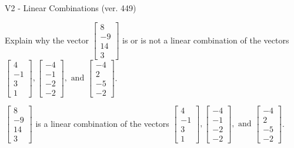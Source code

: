 \begin{exercise}
  \begin{exerciseTitle}V2 - Linear Combinations (ver. 449)\end{exerciseTitle}
  \begin{exerciseStatement}
    Explain why the vector \(\left[\begin{array}{c}
8 \\
-9 \\
14 \\
3
\end{array}\right]\)  is or is not a linear 
	combination of the vectors \(\left[\begin{array}{c}
4 \\
-1 \\
3 \\
1
\end{array}\right] , \left[\begin{array}{c}
-4 \\
-1 \\
-2 \\
-2
\end{array}\right] , \text{ and } \left[\begin{array}{c}
-4 \\
2 \\
-5 \\
-2
\end{array}\right]\).
	


  \end{exerciseStatement}
  \begin{exerciseAnswer}
   \(\left[\begin{array}{c}
8 \\
-9 \\
14 \\
3
\end{array}\right]\) 
  	 is  
	a linear combination of the vectors \(\left[\begin{array}{c}
4 \\
-1 \\
3 \\
1
\end{array}\right] , \left[\begin{array}{c}
-4 \\
-1 \\
-2 \\
-2
\end{array}\right] , \text{ and } \left[\begin{array}{c}
-4 \\
2 \\
-5 \\
-2
\end{array}\right]\).

	
  


  \end{exerciseAnswer}
\end{exercise}